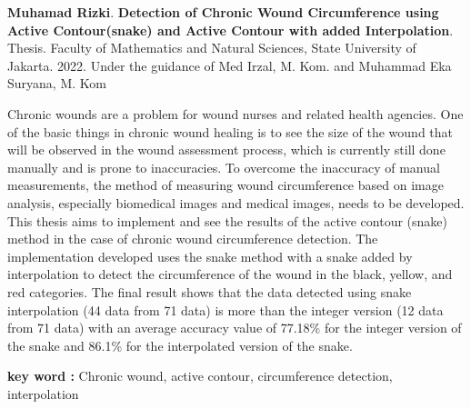 \documentclass{jtetiskripsi}
\begin{document}
\begin{abstracteng}
	
	\textbf{Muhamad Rizki}. 	\textbf{Detection of Chronic Wound Circumference using Active Contour(snake) and Active Contour with added Interpolation}. Thesis. Faculty of Mathematics and Natural Sciences, State University of Jakarta. 2022. Under the guidance of Med Irzal, M. Kom. and Muhammad Eka Suryana, M. Kom
	\vskip1cm
	
	Chronic wounds are a problem for wound nurses and related health agencies. One of the basic things in chronic wound healing is to see the size of the wound that will be observed in the wound assessment process, which is currently still done manually and is prone to inaccuracies. To overcome the inaccuracy of manual measurements, the method of measuring wound circumference based on image analysis, especially biomedical images and medical images, needs to be developed. This thesis aims to implement and see the results of the active contour (snake) method in the case of chronic wound circumference detection. The implementation developed uses the snake method with a snake added by interpolation to detect the circumference of the wound in the black, yellow, and red categories. The final result shows that the data detected using snake interpolation (44 data from 71 data) is more than the integer version (12 data from 71 data) with an average accuracy value of 77.18\% for the integer version of the snake and 86.1\% for the interpolated version of the snake.
	
	\bigskip
	\noindent
	\textbf{key word :} Chronic wound, active contour, circumference detection, interpolation
\end{abstracteng}




\tableofcontents 
{}
\listoffigures
{}
\listoftables
{}
\pagestyle{chapterheading}



\begin{counterpage}
\end{counterpage}
\end{document}

